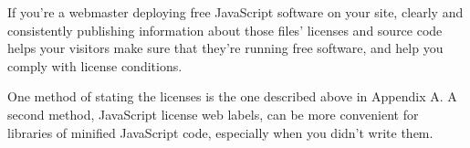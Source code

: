 If you're a webmaster deploying free JavaScript software on your site,
clearly and consistently publishing information about those files'
licenses and source code helps your visitors make sure that they're
running free software, and help you comply with license conditions.

One method of stating the licenses is the one described above in
Appendix A.  A second method, JavaScript license web labels, can be
more convenient for libraries of minified JavaScript code, especially
when you didn't write them.

